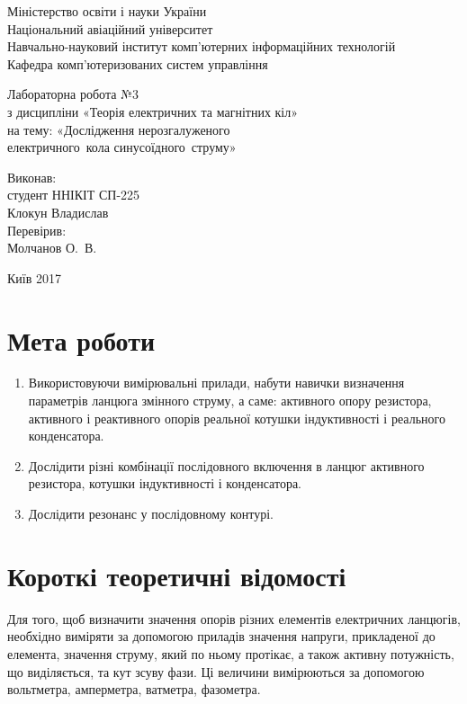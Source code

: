 \documentclass[a4paper,oneside,DIV=12,12pt]{scrartcl}
\begin{document}
	\begin{titlepage}
		\begin{center}
			Міністерство освіти і науки України\\
			Національний авіаційний університет\\
			Навчально-науковий інститут комп'ютерних інформаційних технологій\\
			Кафедра комп'ютеризованих систем управління
			
			\vspace{\fill}
				Лабораторна робота №3\\
				з дисципліни «Теорія електричних та магнітних кіл»\\
				на тему: «Дослідження нерозгалуженого \\
				електричного~кола синусоїдного~струму»\\
				
			\vspace{\fill}
			
			\begin{flushright}
				Виконав:\\
				студент ННІКІТ СП-225\\
				Клокун Владислав\\
				Перевірив:\\
				Молчанов О.~В.
			\end{flushright}
			Київ 2017
		\end{center}
	\end{titlepage}
	
	\section{Мета роботи}
		\begin{enumerate}
			\item Використовуючи вимірювальні прилади, набути навички визначення параметрів ланцюга змінного струму, а саме: активного опору резистора, активного і реактивного опорів реальної котушки індуктивності і реального конденсатора.
			\item Дослідити різні комбінації послідовного включення в ланцюг активного резистора, котушки індуктивності і конденсатора.
			\item Дослідити резонанс у послідовному контурі.
		\end{enumerate}
		
	\section{Короткі теоретичні відомості}
		Для того, щоб визначити значення опорів різних елементів електричних ланцюгів, необхідно виміряти за допомогою приладів значення напруги, прикладеної до елемента, значення струму, який по ньому протікає, а також активну потужність, що виділяється, та кут зсуву фази. Ці величини вимірюються за допомогою вольтметра, амперметра, ватметра, фазометра.
		
\end{document}
